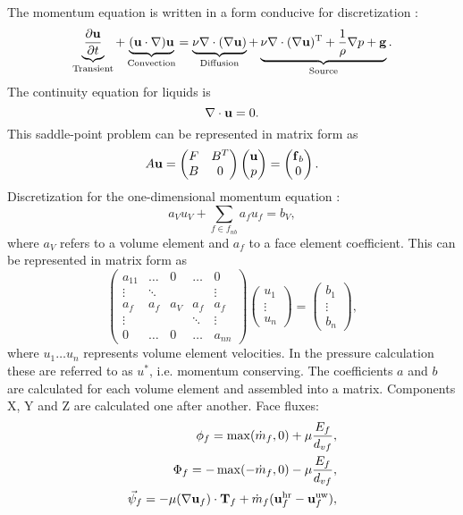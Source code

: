 \documentclass[12pt]{article}
\newcommand{\vb}[1]{\text{\textbf{#1}}}
\newcommand{\T}{\text{T}}
\begin{document}
The momentum equation is written in a form conducive for discretization \cite{mou}:
$$
  \underbrace{\frac{\partial \vb u}{\partial t}}_\text{Transient} + \underbrace{(\vb u \cdot \nabla) \vb u}_\text{Convection} = \underbrace{\nu \nabla \cdot (\nabla \vb u)}_\text{Diffusion} + \underbrace{\nu \nabla \cdot (\nabla \vb u)^\T + \frac{1}{\rho} \nabla p + \vb g}_\text{Source}.
$$
The continuity equation for liquids is
$$
\nabla \cdot \vb u = 0.
$$
This saddle-point problem can be represented in matrix form as \cite{mou, qs}
$$
A \vb u = \begin{pmatrix}
  F & B^T \\
  B & 0
\end{pmatrix}
\begin{pmatrix}
  \vb u \\
  p
\end{pmatrix} =
\begin{pmatrix}
  \vb f_b \\
  0
\end{pmatrix}.
$$
Discretization for the one-dimensional momentum equation \cite{mou}:
\begin{equation}
  a_V u_V + \sum_{f \in f_{nb}} a_f u_f = b_V,
\end{equation}
where $a_V$ refers to a volume element and $a_f$ to a face element coefficient. This can be represented in matrix form as
$$
\begin{pmatrix}
  a_{11} & \dots & 0 & \dots & 0 \\
  \vdots & \ddots & &  & \vdots \\
  a_f & a_f & a_V & a_f & a_f \\
  \vdots & &  & \ddots & \vdots \\
  0 & \dots & 0 & \dots & a_{nn}
\end{pmatrix}
\begin{pmatrix}
  u_1 \\
  \vdots \\
  u_n
\end{pmatrix} =
\begin{pmatrix}
  b_{1} \\
  \vdots \\
  b_n
\end{pmatrix},
$$
where $u_1 \dots u_n$ represents volume element velocities. In the pressure calculation these are referred to as $u^*$, i.e. momentum conserving. The coefficients $a$ and $b$ are calculated for each volume element and assembled into a matrix. Components X, Y and Z are calculated one after another.
Face fluxes:
\begin{align}
  \phi_f = \max(\dot m_f, 0) + \mu \frac{E_f}{d_{vf}}, \\
  \Phi_f = -\max(-\dot m_f, 0) - \mu \frac{E_f}{d_{vf}}, \\
  \vec \psi_f = - \mu (\nabla \vb u_f) \cdot \vb T_f + \dot m_f (\vb u_f^{\text{hr}} - \vb u_f^{\text{uw}}),
\end{align}
\end{document}
